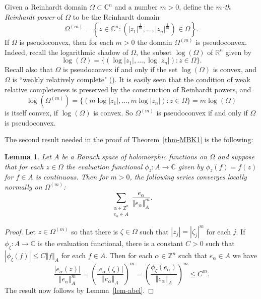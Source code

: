 \documentclass[letterpaper,11pt,reqno]{amsart}
\theoremstyle{plain}
\newtheorem{lemma}[equation]{Lemma}
\theoremstyle{definition}
\theoremstyle{remark}
\theoremstyle{remark}
\numberwithin{equation}{section}
\newcommand{\abs}[1]{\left\vert#1\right\vert}
\newcommand{\norm}[1]{\left\Vert#1\right\Vert}
\newcommand{\cx}{{\mathbb C}}
\newcommand{\rl}{\mathbb R}
\newcommand{\C}{{\mathbb C}}
\newcommand{\Z}{{\mathbb Z}}
\begin{document}
Given a Reinhardt domain $\Omega\subset \cx^n$ and a number $m>0$, define the {\em $m$-th Reinhardt power} of $\Omega$ to be the Reinhardt domain
\begin{equation}\label{E:ReinhardtPower}
\Omega^{(m)} = \left\{ z\in \C^n : \left(\abs{z_1}^{\frac{1}{m}}, \dots, \abs{z_n}^{\frac{1}{m}}\right) \in \Omega\right\}.
\end{equation}
If $\Omega$ is pseudoconvex, then for each $m>0$ the domain $\Omega^{(m)}$ is  pseudoconvex. 
Indeed, recall the logarithmic shadow of $\Omega$, the subset $\log(\Omega)$ of $\rl^n$ given by 
\begin{equation}\label{eq-logshadow}
\log(\Omega )= \{\left(\log\abs{z_1},\dots, \log \abs{z_n}\right): z\in \Omega\}.
\end{equation}
Recall also that  $\Omega$ is pseudoconvex if and only if the set $\log(\Omega)$ is convex, and $\Omega$ is ``weakly relatively complete" (\cite[Theorem 1.11.13 and Proposition~1.11.6]{JarPflBook08}). 
It is easily seen that the condition of weak relative completeness is preserved by the construction of Reinhardt powers, and
\[ 
\log\left(\Omega^{(m)}\right) = \{(m\log\abs{z_1},\dots, m\log\abs{z_n}): z\in \Omega\} = m\log(\Omega)
\]
is itself convex, if $\log(\Omega)$ is convex. 
So $\Omega^{(m)}$ is pseudoconvex if and only if $\Omega$ is pseudoconvex.

The second result needed in the proof of Theorem~\ref{thm-MBK1} is the following:
\begin{lemma}\label{lem-series}
Let $A$ be a Banach space of holomorphic functions on $\Omega$ and suppose that for each $z\in \Omega$ the evaluation functional $\phi_z : A \to \cx$ given by $\phi_z(f)=f(z)$ for $f\in A$ is continuous. 
Then for  $m>0$, the following series converges locally normally on $\Omega^{(m)}$:
\begin{equation*}
\sum_{\substack{\alpha\in \Z^n\\ e_\alpha\in A} } \frac{e_\alpha}{\norm{e_\alpha}_A^m}.
\end{equation*}
\end{lemma}
\begin{proof}
Let $z\in \Omega^{(m)}$ so that there is $\zeta\in \Omega$ such that $\abs{z_j}=\abs{\zeta_j}^m$ for each $j$. 
If $\phi_\zeta: A \to \cx$ is the evaluation functional, there is a constant $C>0$ such that $\abs{\phi_\zeta(f)}\leq C \norm{f}_A$ for each $f\in A$. 
Then for each $\alpha\in \Z^n$ such that $e_\alpha\in A$ we have
\begin{equation*}
\frac{\abs{e_\alpha(z)}}{\norm{e_\alpha}_A^m}= \left(\frac{\abs{e_\alpha(\zeta)}}{\norm{e_\alpha}_A}\right)^m= \left(\frac{\phi_\zeta(e_\alpha)}{\norm{e_\alpha}_A}\right)^m \leq C^m.
\end{equation*}
The result now follows by Lemma~\ref{lem-abel}.
\end{proof}
\end{document}
